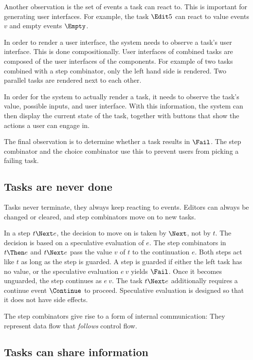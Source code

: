 Another observation is the set of events a task can react to.
This is important for generating user interfaces.
For example, the task $\Edit 5$ can react to value events $v$ and empty events $\Empty$.

In order to render a user interface, the system needs to observe a task's user interface.
This is done compositionally.
User interfaces of combined tasks are composed of the user interfaces of the components.
For example of two tasks combined with a step combinator, only the left hand side is rendered.
Two parallel tasks are rendered next to each other.

In order for the system to actually render a task, it needs to observe the task's value, possible inputs, and user interface.
With this information, the system can then display the current state of the task, together with buttons that show the actions a user can engage in.

The final observation is to determine whether a task results in $\Fail$.
The step combinator and the choice combinator use this to prevent users from picking a failing task.




\subsection{Tasks are never done}

Tasks never terminate, they always keep reacting to events.
Editors can always be changed or cleared, and step combinators move on to new tasks.

In a step $t \Next e$, the decision to move on is taken by $\Next$, not by $t$.
The decision is based on a speculative evaluation of $e$.
The step combinators in $t \Then e$ and $t \Next e$ pass the value $v$ of $t$ to the continuation $e$.
Both steps act like $t$ as long as the step is guarded.
A step is guarded if either the left task has no value, or the speculative evaluation $e\ v$ yields $\Fail$.
Once it becomes unguarded, the step continues as $e\ v$.
The task $t \Next e$ additionally requires a continue event $\Continue$ to proceed.
Speculative evaluation is designed so that it does not have side effects.

The step combinators give rise to a form of internal communication:
They represent data flow that \emph{follows} control flow.




\subsection{Tasks can share information}

